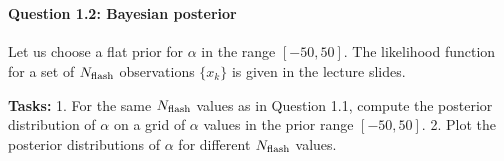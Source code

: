\documentclass[11pt]{article}
\begin{document}
    \begin{center}
    \end{center}
    { \hspace*{\fill} \\}
    
    \paragraph{Question 1.2: Bayesian
posterior}\label{question-1.2-bayesian-posterior}

Let us choose a flat prior for \(\alpha\) in the range \([-50, 50]\).
The likelihood function for a set of \(N_{\rm flash}\) observations
\(\{x_k\}\) is given in the lecture slides.

\textbf{Tasks:} 1. For the same \(N_{\rm flash}\) values as in Question
1.1, compute the posterior distribution of \(\alpha\) on a grid of
\(\alpha\) values in the prior range \([-50, 50]\). 2. Plot the
posterior distributions of \(\alpha\) for different \(N_{\rm flash}\)
values.
\end{document}
